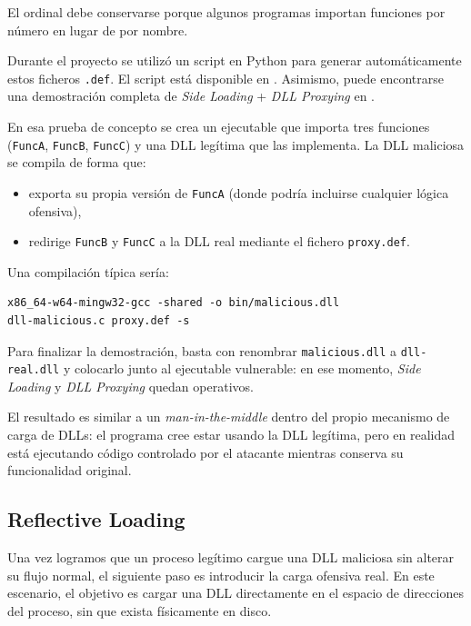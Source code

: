 El ordinal debe conservarse porque algunos programas importan funciones por número en lugar de por nombre.

Durante el proyecto se utilizó un script en Python para generar automáticamente estos ficheros \texttt{.def}. El script está disponible en \cite{exports_py}.
Asimismo, puede encontrarse una demostración completa de \textit{Side Loading} + \textit{DLL Proxying} en \cite{dll_proxy_demo}.

En esa prueba de concepto se crea un ejecutable que importa tres funciones (\texttt{FuncA}, \texttt{FuncB}, \texttt{FuncC}) y una DLL legítima que las implementa. La DLL maliciosa se compila de forma que:

\begin{itemize}
\item exporta su propia versión de \texttt{FuncA} (donde podría incluirse cualquier lógica ofensiva),
\item redirige \texttt{FuncB} y \texttt{FuncC} a la DLL real mediante el fichero \texttt{proxy.def}.
\end{itemize}

Una compilación típica sería:

\begin{verbatim}
x86_64-w64-mingw32-gcc -shared -o bin/malicious.dll
dll-malicious.c proxy.def -s
\end{verbatim}

Para finalizar la demostración, basta con renombrar \texttt{malicious.dll} a \texttt{dll-real.dll} y colocarlo junto al ejecutable vulnerable: en ese momento, \textit{Side Loading} y \textit{DLL Proxying} quedan operativos.

El resultado es similar a un \textit{man-in-the-middle} dentro del propio mecanismo de carga de DLLs: el programa cree estar usando la DLL legítima, pero en realidad está ejecutando código controlado por el atacante mientras conserva su funcionalidad original.
\subsection{Reflective Loading}

Una vez logramos que un proceso legítimo cargue una DLL maliciosa sin alterar su flujo normal, el siguiente paso es introducir la carga ofensiva real. En este escenario, el objetivo es cargar una DLL directamente en el espacio de direcciones del proceso, sin que exista físicamente en disco.

